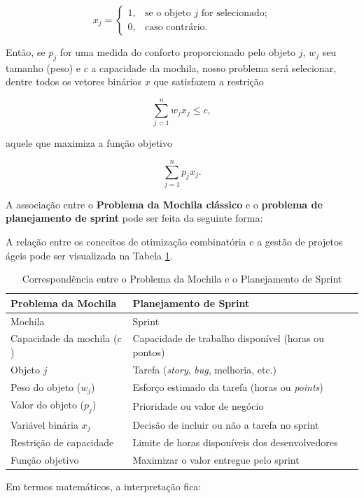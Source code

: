 \documentclass[12pt]{article}
\begin{document}
\[
x_j =
\begin{cases}
1, & \text{se o objeto } j \text{ for selecionado;} \\
0, & \text{caso contrário.}
\end{cases}
\]

Então, se $p_j$ for uma medida do conforto proporcionado pelo objeto $j$, $w_j$ seu tamanho (peso) e $c$ a capacidade da mochila, nosso problema será selecionar, dentre todos os vetores binários $x$ que satisfazem a restrição

\[
\sum_{j=1}^{n} w_j x_j \leq c,
\]

aquele que maximiza a função objetivo

\[
\sum_{j=1}^{n} p_j x_j.
\]

A associação entre o \textbf{Problema da Mochila clássico} e o \textbf{problema de planejamento de sprint} pode ser feita da seguinte forma:

A relação entre os conceitos de otimização combinatória e a gestão de projetos ágeis pode ser visualizada na Tabela \ref{tab:mochila-sprint}. %

\begin{table}[ht]
\centering
\caption{Correspondência entre o Problema da Mochila e o Planejamento de Sprint}
\label{tab:mochila-sprint}
\begin{tabularx}{\textwidth}{lX}
\toprule
\textbf{Problema da Mochila} & \textbf{Planejamento de Sprint} \\
\midrule
Mochila & Sprint \\
Capacidade da mochila ($c$) & Capacidade de trabalho disponível (horas ou pontos) \\
Objeto $j$ & Tarefa (\textit{story}, \textit{bug}, melhoria, etc.) \\
Peso do objeto ($w_j$) & Esforço estimado da tarefa (horas ou \textit{points}) \\
Valor do objeto ($p_j$) & Prioridade ou valor de negócio \\
Variável binária $x_j$ & Decisão de incluir ou não a tarefa no sprint \\
Restrição de capacidade & Limite de horas disponíveis dos desenvolvedores \\
Função objetivo & Maximizar o valor entregue pelo sprint \\
\bottomrule
\end{tabularx}
\end{table}

Em termos matemáticos, a interpretação fica:
\end{document}
